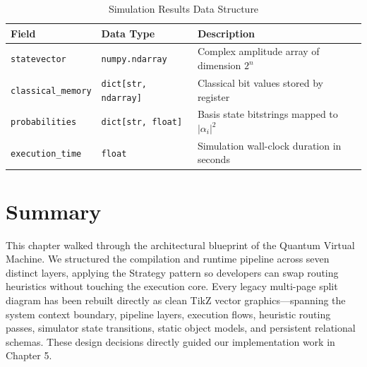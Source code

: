 \begin{table}[H]
\centering
\caption{Simulation Results Data Structure}
\label{tab:results_struct}
\begin{tabular}{|p{3.5cm}|p{3.5cm}|p{6.5cm}|}
\hline
\textbf{Field} & \textbf{Data Type} & \textbf{Description} \\
\hline
\texttt{statevector} & \texttt{numpy.ndarray} & Complex amplitude array of dimension $2^n$ \\
\hline
\texttt{classical\_memory} & \texttt{dict[str, ndarray]} & Classical bit values stored by register \\
\hline
\texttt{probabilities} & \texttt{dict[str, float]} & Basis state bitstrings mapped to $|\alpha_i|^2$ \\
\hline
\texttt{execution\_time} & \texttt{float} & Simulation wall-clock duration in seconds \\
\hline
\end{tabular}
\end{table}

\section{Summary}
This chapter walked through the architectural blueprint of the Quantum Virtual Machine. We structured the compilation and runtime pipeline across seven distinct layers, applying the Strategy pattern so developers can swap routing heuristics without touching the execution core. Every legacy multi-page split diagram has been rebuilt directly as clean TikZ vector graphics---spanning the system context boundary, pipeline layers, execution flows, heuristic routing passes, simulator state transitions, static object models, and persistent relational schemas. These design decisions directly guided our implementation work in Chapter 5.
